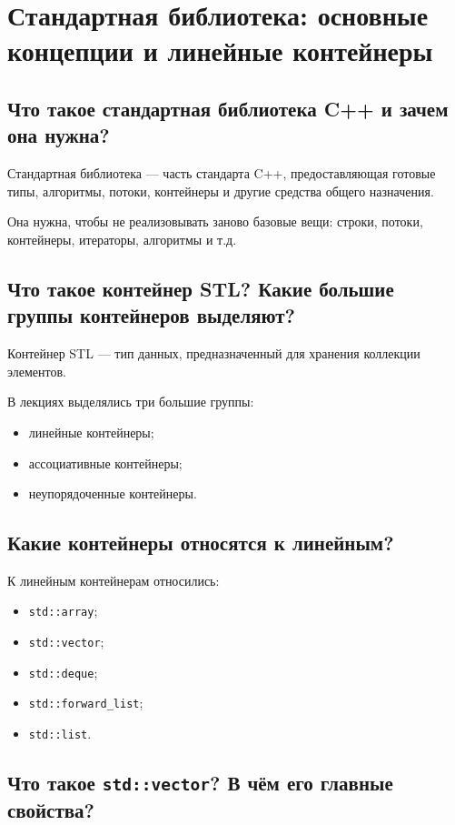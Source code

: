 \section{Стандартная библиотека: основные концепции и линейные контейнеры}

\subsection{Что такое стандартная библиотека C++ и зачем она нужна?}

Стандартная библиотека --- часть стандарта C++, предоставляющая готовые типы, алгоритмы, потоки, контейнеры и другие средства общего назначения.

Она нужна, чтобы не реализовывать заново базовые вещи: строки, потоки, контейнеры, итераторы, алгоритмы и т.д.


\subsection{Что такое контейнер STL? Какие большие группы контейнеров выделяют?}

Контейнер STL --- тип данных, предназначенный для хранения коллекции элементов.

В лекциях выделялись три большие группы:
\begin{itemize}
    \item линейные контейнеры;
    \item ассоциативные контейнеры;
    \item неупорядоченные контейнеры.
\end{itemize}


\subsection{Какие контейнеры относятся к линейным?}

К линейным контейнерам относились:
\begin{itemize}
    \item \texttt{std::array};
    \item \texttt{std::vector};
    \item \texttt{std::deque};
    \item \texttt{std::forward\_list};
    \item \texttt{std::list}.
\end{itemize}


\subsection{Что такое \texttt{std::vector}? В чём его главные свойства?}

